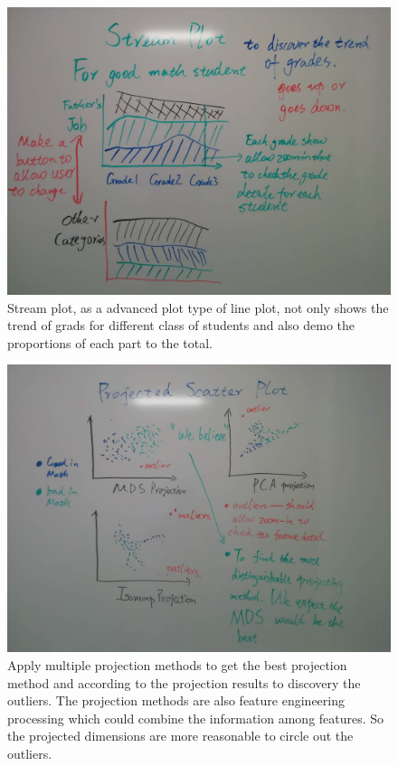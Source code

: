 \documentclass{article}
\begin{document}
\begin{figure}[H]
\centering
\includegraphics[scale=0.25]{stream_plot.jpg}
\caption{Stream plot, as a advanced plot type of line plot, not only shows the trend of grads for different class of students and also demo the proportions of each part to the total.}
\end{figure}

\begin{figure}[H]
\centering
\includegraphics[scale=0.25]{projected_scatter.jpg}
\caption{Apply multiple projection methods to get the best projection method and according to the projection results to discovery the outliers. The projection methods are also feature engineering processing which could combine the information among features. So the projected dimensions are more reasonable to circle out the outliers.}
\end{figure}
\end{document}
